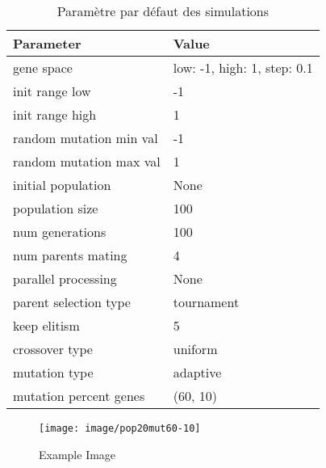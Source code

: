 \documentclass[journal, a4paper]{IEEEtran}
\begin{document}
	\begin{table}[!hbt]
		\begin{center}
		\caption{Paramètre par défaut des simulations}
		\label{tab:simParameters}
		\begin{tabular}{|l|l|}
			\hline
			\textbf{Parameter} & \textbf{Value} \\
			\hline
			gene space & {low: -1, high: 1, step: 0.1} \\
			\hline
			init range low & -1 \\
			\hline
			init range high & 1 \\
			\hline
			random mutation min val & -1 \\
			\hline
			random mutation max val & 1 \\
			\hline
			initial population & None \\
			\hline
			population size & 100 \\
			\hline
			num generations & 100 \\
			\hline
			num parents mating & 4 \\
			\hline
			parallel processing & None \\
			\hline
			parent selection type & tournament \\
			\hline
			keep elitism & 5 \\
			\hline
			crossover type & uniform \\
			\hline
			mutation type & adaptive \\
			\hline
			mutation percent genes & (60, 10) \\
			\hline
			\end{tabular}
		\end{center}
	\end{table}
	\begin{figure}
	  \centering
	  \texttt{[image: image/pop20mut60-10]}
	  \caption{Example Image}
	  \label{fig:pop20mut60-10}
	\end{figure}
\end{document}

